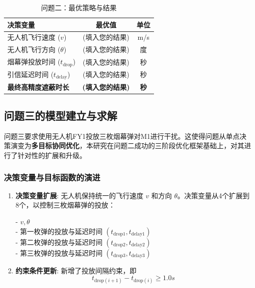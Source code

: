 \documentclass[12pt]{article}
\begin{document}
\begin{CJK}{UTF8}{gbsn}
		\begin{table}[H]
			\centering
			\caption{问题二：最优策略与结果}
			\label{tab:results_q2}
			\begin{tabular}{@{}lcc@{}}
				\toprule
				决策变量               & 最优值      & 单位 \\ \midrule
				无人机飞行速度 ($v$)     & (填入您的结果) & m/s  \\
				无人机飞行方向 ($\theta$)    & (填入您的结果) & 度   \\
				烟幕弹投放时间 ($t_{\text{drop}}$) & (填入您的结果) & 秒   \\
				引信延迟时间 ($t_{\text{delay}}$)   & (填入您的结果) & 秒   \\ \midrule
				\textbf{最终高精度遮蔽时长} & \textbf{(填入您的结果)} & \textbf{秒}   \\ \bottomrule
			\end{tabular}
		\end{table}
		
		\subsection{问题三的模型建立与求解}
		
		
		问题三要求使用无人机FY1投放三枚烟幕弹对M1进行干扰。这使得问题从单点决策演变为\textbf{多目标协同优化}，本研究在问题二成功的三阶段优化框架基础上，对其进行了针对性的扩展和升级。
		
		\subsubsection{决策变量与目标函数的演进}
		
		\begin{enumerate}
			\item \textbf{决策变量扩展}: 无人机保持统一的飞行速度 $v$ 和方向 $\theta$。决策变量从4个扩展到8个，以控制三枚烟幕弹的投放：
			
			- $v, \theta$\\
			\indent - 第一枚弹的投放与延迟时间 $(t_{\text{drop1}}, t_{\text{delay1}})$\\
			\indent - 第二枚弹的投放与延迟时间 $(t_{\text{drop2}}, t_{\text{delay2}})$\\
			\indent - 第三枚弹的投放与延迟时间 $(t_{\text{drop3}}, t_{\text{delay3}})$
			
			\item \textbf{约束条件更新}: 新增了投放间隔约束，即
			\begin{equation}
				t_{\text{drop}(i+1)} - t_{\text{drop}(i)} \ge 1.0 s
			\end{equation}
			

\end{enumerate}
\end{CJK}
\end{document}
